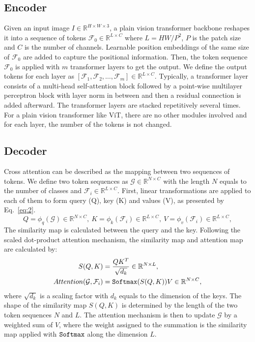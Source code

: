 \documentclass{article}
\makeatletter
\renewcommand{\paragraph}{\@startsection{paragraph}{4}{\z@}{.5ex \@plus 1ex \@minus .2ex}{-1em}{\normalfont\normalsize\bfseries}}
\def\R{{\mathbb R}}
\def\atm{ATM}
\makeatother
\begin{document}
\subsection{Encoder}
Given an input image $I \in \R^{H \times W \times 3}$, a plain vision transformer backbone reshapes it into a sequence of tokens $\mathcal{F}_{0} \in \R^{L \times C}$ where $L = HW/P^2$, $P$ is the patch size and $C$ is the number of channels. 
Learnable position embeddings of the same size of $\mathcal{F}_{0}$ are added to capture the positional information. Then, the token sequence $\mathcal{F}_{0}$ is applied with $m$ transformer layers to get the output.
We define the output tokens for each layer as $[\mathcal{F}_{1}, \mathcal{F}_{2}, \dots , \mathcal{F}_{m}] \in \R^{L \times C}$.
Typically, a transformer layer consists of a multi-head self-attention 
block followed by a point-wise multilayer perceptron 
block with layer norm 
in between and then a residual connection is added afterward. 
The transformer layers are stacked repetitively  several times. 
For a plain vision transformer like ViT, there are no other modules involved and for each layer, the number of the tokens is not changed.

\subsection{Decoder}
\paragraph{Mask-to-Attention (\atm).}
Cross attention can be described as the mapping between two sequences of tokens. We define two token sequences as $\mathcal{G} \in \R^{N \times C}$ with the length $N$ equals to the number of classes and  $\mathcal{F}_{i} \in \R^{L \times C}$.
First, linear transformations are applied to each of them to form query (Q), key (K) and values (V), as presented by Eq.~\eqref{eq:2}.
\begin{equation}
    Q  =  \phi_{q} (\mathcal{G}) \in \R^{N \times C},\ 
    K = \phi_{k} (\mathcal{F}_{i}) \in \R^{L \times C},\ 
    V = \phi_{v} (\mathcal{F}_{i}) \in \R^{L \times C},
    \label{eq:2}
\end{equation}
The similarity map is calculated between the query and the key. 
Following the scaled dot-product attention mechanism, the similarity map and attention map are calculated by: 
\begin{equation} 
\begin{split}
       S(Q, K)& = \frac{QK^T}{\sqrt{d_{k}}}\in \R^{N \times L}, \\
        Attention(\mathcal{G}, \mathcal{F}_{i}) & = 
        {\tt Softmax}(S(Q, K))V \in \R^{N \times C},
\end{split}
\end{equation}
where $\sqrt{d_{k}}$ is a scaling factor with $d_{k}$ equals to the dimension of the keys. 
The shape of the similarity map $S(Q, K)$ is determined by the length of 
the two token sequences $N$ and $L$.
The attention mechanism is then to update  $\mathcal{G}$ by a weighted sum of $V$, where the weight assigned to the summation is the similarity map applied with $\tt Softmax$ along the dimension $L$.
\end{document}
